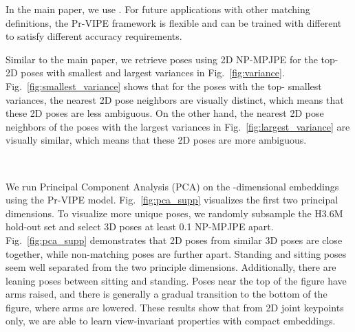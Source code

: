 In the main paper, we use . For future applications with other matching definitions, the Pr-VIPE framework is flexible and can be trained with different  to satisfy different accuracy requirements.


 Similar to the main paper, we retrieve poses using 2D NP-MPJPE for the top- 2D poses with smallest and largest variances in Fig.~\ref{fig:variance}. Fig.~\ref{fig:smallest_variance} shows that for the poses with the top- smallest variances, the nearest 2D pose neighbors are visually distinct, which means that these 2D poses are less ambiguous. On the other hand, the nearest 2D pose neighbors of the poses with the largest variances in Fig.~\ref{fig:largest_variance} are visually similar, which means that these 2D poses are more ambiguous.

\begin{figure*}[t!]
  \centering
  \\
  




\caption{Top retrievals by 2D NP-MPJPE from H3.6M hold-out subset for queries with top- largest and smallest variances. 2D poses are shown in the boxes.}
\label{fig:variance}
\end{figure*}

 We run Principal Component Analysis (PCA) on the -dimensional embeddings using the Pr-VIPE model. Fig.~\ref{fig:pca_supp} visualizes the first two principal dimensions. To visualize more unique poses, we randomly subsample the H3.6M hold-out set and select 3D poses at least 0.1 NP-MPJPE apart. Fig.~\ref{fig:pca_supp} demonstrates that 2D poses from similar 3D poses are close together, while non-matching poses are further apart. Standing and sitting poses seem well separated from the two principle dimensions. Additionally, there are leaning poses between sitting and standing. Poses near the top of the figure have arms raised, and there is generally a gradual transition to the bottom of the figure, where arms are lowered. These results show that from 2D joint keypoints only, we are able to learn view-invariant properties with compact embeddings.

